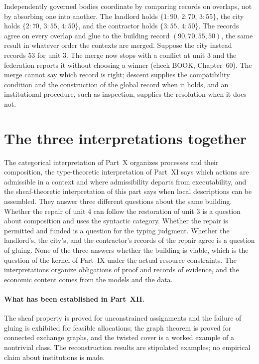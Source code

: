 Independently governed bodies coordinate by comparing records on overlaps, not by absorbing one into another. The landlord holds $\{1:90,\,2:70,\,3:55\}$, the city holds $\{2:70,\,3:55,\,4:50\}$, and the contractor holds $\{3:55,\,4:50\}$. The records agree on every overlap and glue to the building record $(90,70,55,50)$, the same result in whatever order the contexts are merged. Suppose the city instead records $53$ for unit $3$. The merge now stops with a conflict at unit $3$ and the federation reports it without choosing a winner (check BOOK, Chapter~60). The merge cannot say which record is right; descent supplies the compatibility condition and the construction of the global record when it holds, and an institutional procedure, such as inspection, supplies the resolution when it does not.

\section{The three interpretations together}

The categorical interpretation of Part~X organizes processes and their composition, the type-theoretic interpretation of Part~XI says which actions are admissible in a context and where admissibility departs from executability, and the sheaf-theoretic interpretation of this part says when local descriptions can be assembled. They answer three different questions about the same building. Whether the repair of unit $4$ can follow the restoration of unit $3$ is a question about composition and uses the syntactic category. Whether the repair is permitted and funded is a question for the typing judgment. Whether the landlord's, the city's, and the contractor's records of the repair agree is a question of gluing. None of the three answers whether the building is viable, which is the question of the kernel of Part~IX under the actual resource constraints. The interpretations organize obligations of proof and records of evidence, and the economic content comes from the models and the data.

\paragraph{What has been established in Part~XII.} The sheaf property is proved for unconstrained assignments and the failure of gluing is exhibited for feasible allocations; the graph theorem is proved for connected exchange graphs, and the twisted cover is a worked example of a nontrivial class. The reconstruction results are stipulated examples; no empirical claim about institutions is made.

